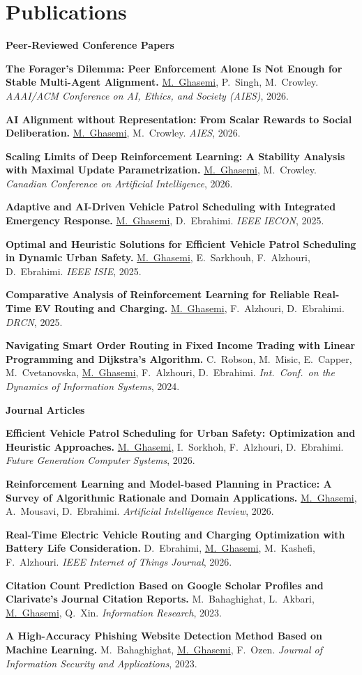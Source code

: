 \documentclass[letterpaper,11pt]{article}
\newcommand{\me}{\underline{M.~Ghasemi}}
\newcommand{\pubhead}[1]{\vspace{0.25em}\textbf{\small #1}\par}
\begin{document}
\section{Publications}
\pubhead{Peer-Reviewed Conference Papers}
\begin{pubs}[label={[C\arabic*]}]
  \item \textbf{The Forager's Dilemma: Peer Enforcement Alone Is Not Enough for Stable Multi-Agent Alignment.} \me, P.~Singh, M.~Crowley. \textit{AAAI/ACM Conference on AI, Ethics, and Society (AIES)}, 2026.
  \item \textbf{AI Alignment without Representation: From Scalar Rewards to Social Deliberation.} \me, M.~Crowley. \textit{AIES}, 2026.
  \item \textbf{Scaling Limits of Deep Reinforcement Learning: A Stability Analysis with Maximal Update Parametrization.} \me, M.~Crowley. \textit{Canadian Conference on Artificial Intelligence}, 2026.
  \item \textbf{Adaptive and AI-Driven Vehicle Patrol Scheduling with Integrated Emergency Response.} \me, D.~Ebrahimi. \textit{IEEE IECON}, 2025.
  \item \textbf{Optimal and Heuristic Solutions for Efficient Vehicle Patrol Scheduling in Dynamic Urban Safety.} \me, E.~Sarkhouh, F.~Alzhouri, D.~Ebrahimi. \textit{IEEE ISIE}, 2025.
  \item \textbf{Comparative Analysis of Reinforcement Learning for Reliable Real-Time EV Routing and Charging.} \me, F.~Alzhouri, D.~Ebrahimi. \textit{DRCN}, 2025.
  \item \textbf{Navigating Smart Order Routing in Fixed Income Trading with Linear Programming and Dijkstra's Algorithm.} C.~Robson, M.~Misic, E.~Capper, M.~Cvetanovska, \me, F.~Alzhouri, D.~Ebrahimi. \textit{Int.\ Conf.\ on the Dynamics of Information Systems}, 2024.
\end{pubs}
\pubhead{Journal Articles}
\begin{pubs}[label={[J\arabic*]}]
  \item \textbf{Efficient Vehicle Patrol Scheduling for Urban Safety: Optimization and Heuristic Approaches.} \me, I.~Sorkhoh, F.~Alzhouri, D.~Ebrahimi. \textit{Future Generation Computer Systems}, 2026.
  \item \textbf{Reinforcement Learning and Model-based Planning in Practice: A Survey of Algorithmic Rationale and Domain Applications.} \me, A.~Mousavi, D.~Ebrahimi. \textit{Artificial Intelligence Review}, 2026.
  \item \textbf{Real-Time Electric Vehicle Routing and Charging Optimization with Battery Life Consideration.} D.~Ebrahimi, \me, M.~Kashefi, F.~Alzhouri. \textit{IEEE Internet of Things Journal}, 2026.
  \item \textbf{Citation Count Prediction Based on Google Scholar Profiles and Clarivate's Journal Citation Reports.} M.~Bahaghighat, L.~Akbari, \me, Q.~Xin. \textit{Information Research}, 2023.
  \item \textbf{A High-Accuracy Phishing Website Detection Method Based on Machine Learning.} M.~Bahaghighat, \me, F.~Ozen. \textit{Journal of Information Security and Applications}, 2023.
\end{pubs}
\end{document}
